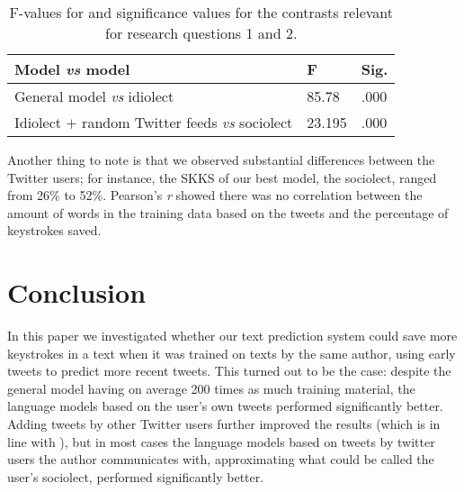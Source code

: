 \documentclass[11pt]{article}
\begin{document}
\begin{table}[htb]
\begin{center}
\begin{tabular}{p{4.5cm}|ll} 
Model \emph{vs} model & F & Sig.\\
\hline 
General model \emph{vs} idiolect & 85.78 & .000\\ 
Idiolect $+$ random Twitter feeds \emph{vs} sociolect & 23.195 & .000\\
\end{tabular}
\caption{F-values for and significance values for the contrasts relevant for research questions 1 and 2.}
\label{stat}
\end{center}
\end{table}

 Another thing to note is that we observed substantial differences between the Twitter users; for instance, the SKKS of our best model, the sociolect, ranged from 26\% to 52\%. Pearson's \emph{r} showed there was no correlation between the amount of words in the training data based on the tweets and the percentage of keystrokes saved.

\section{Conclusion}
In this paper we investigated whether our text prediction system could save more keystrokes in a text when it was trained on texts by the same author, using early tweets to predict more recent tweets. This turned out to be the case: despite the general model having on average 200 times as much training material, the language models based on the user's own tweets performed significantly better. Adding tweets by other Twitter users further improved the results (which is in line with \cite{verberne12}), but in most cases the language models based on tweets by twitter users the author communicates with, approximating what could be called the user's sociolect, performed significantly better.



\end{document}
